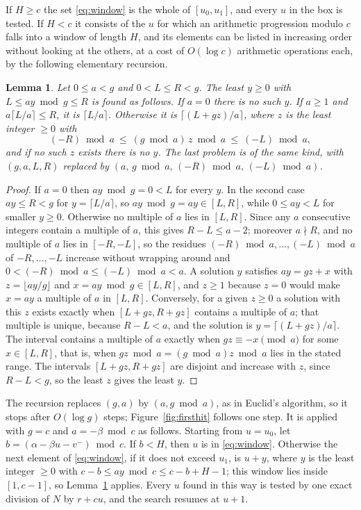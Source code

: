 \documentclass[screen,reqno]{aomart}
\numberwithin{equation}{section}
\theoremstyle{plain}
\newtheorem{lemma}[theorem]{Lemma}
\theoremstyle{definition}
\theoremstyle{remark}
\begin{document}
If $H\ge c$ the set \eqref{eq:window} is the whole of $[u_0,u_1]$,
and every $u$ in the box is tested. If $H<c$ it consists of the $u$
for which an arithmetic progression modulo $c$ falls into a window of
length $H$, and its elements can be listed in increasing order without
looking at the others, at a cost of $O(\log c)$ arithmetic operations
each, by the following elementary recursion.

\begin{lemma}\label{lem:firsthit}
Let $0\le a<g$ and $0<L\le R<g$. The least $y\ge0$ with
$L\le ay\bmod g\le R$ is found as follows. If $a=0$ there is no such
$y$. If $a\ge1$ and $a\lceil L/a\rceil\le R$, it is $\lceil L/a\rceil$.
Otherwise it is $\lceil(L+gz)/a\rceil$, where $z$ is the least integer
$\ge0$ with
\[
  (-R)\bmod a\ \le\ (g\bmod a)\,z\bmod a\ \le\ (-L)\bmod a ,
\]
and if no such $z$ exists there is no $y$. The last problem is of the
same kind, with $(g,a,L,R)$ replaced by
$(a,\,g\bmod a,\,(-R)\bmod a,\,(-L)\bmod a)$.
\end{lemma}

\begin{proof}
If $a=0$ then $ay\bmod g=0<L$ for every $y$. In the second case
$ay\le R<g$ for $y=\lceil L/a\rceil$, so $ay\bmod g=ay\in[L,R]$, while
$0\le ay<L$ for smaller $y\ge0$. Otherwise no multiple of $a$ lies in
$[L,R]$. Since any $a$ consecutive integers contain a multiple of $a$,
this gives $R-L\le a-2$; moreover $a\nmid R$, and no multiple of $a$
lies in $[-R,-L]$, so the residues $(-R)\bmod a,\dots,(-L)\bmod a$ of
$-R,\dots,-L$ increase without wrapping around and
$0<(-R)\bmod a\le(-L)\bmod a<a$. A solution $y$ satisfies $ay=gz+x$
with $z=\lfloor ay/g\rfloor$ and $x=ay\bmod g\in[L,R]$, and $z\ge1$
because $z=0$ would make $x=ay$ a multiple of $a$ in $[L,R]$.
Conversely, for a given $z\ge0$ a solution with this $z$ exists
exactly when $[L+gz,R+gz]$ contains a multiple of $a$; that multiple
is unique, because $R-L<a$, and the solution is
$y=\lceil(L+gz)/a\rceil$. The
interval contains a multiple of $a$ exactly when $gz\equiv-x\pmod a$
for some $x\in[L,R]$, that is, when $gz\bmod a=(g\bmod a)z\bmod a$
lies in the stated range. The intervals $[L+gz,R+gz]$ are disjoint
and increase with $z$, since $R-L<g$, so the least $z$ gives the least
$y$.
\end{proof}

The recursion replaces $(g,a)$ by $(a,g\bmod a)$, as in Euclid's
algorithm, so it stops after $O(\log g)$ steps; Figure~\ref{fig:firsthit}
follows one step. It is applied with
$g=c$ and $a=-\beta\bmod c$ as follows. Starting from $u=u_0$, let
$b=(\alpha-\beta u-v^-)\bmod c$. If $b<H$, then $u$ is in
\eqref{eq:window}. Otherwise the next element of \eqref{eq:window}, if it
does not exceed $u_1$, is $u+y$, where $y$ is the least integer $\ge0$ with
$c-b\le ay\bmod c\le c-b+H-1$; this window lies inside $[1,c-1]$, so
Lemma~\ref{lem:firsthit} applies. Every $u$ found in this way is
tested by one exact division of $N$ by $r+cu$, and the search resumes
at $u+1$.
\end{document}
